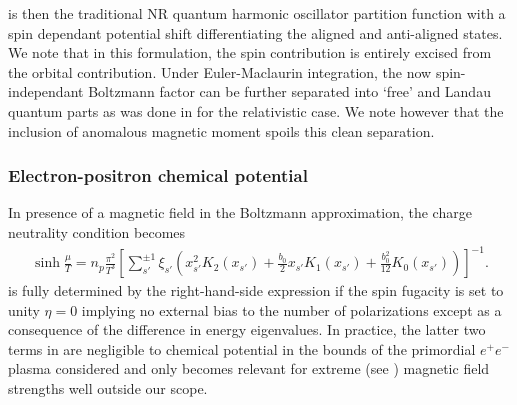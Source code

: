 is then the traditional NR quantum harmonic oscillator partition function with a spin dependant potential shift differentiating the aligned and anti-aligned states. We note that in this formulation, the spin contribution is entirely excised from the orbital contribution. Under Euler-Maclaurin integration, the now spin-independant Boltzmann factor can be further separated into `free' and Landau quantum parts as was done in  for the relativistic case. We note however that the inclusion of anomalous magnetic moment spoils this clean separation.

\subsubsection{Electron-positron chemical potential}
\label{sec:chem}
\noindent In presence of a magnetic field in the Boltzmann approximation, the charge neutrality condition  becomes
\begin{gather}
 \label{chem}
 \sinh\frac{\mu}{T}=n_{p}\frac{\pi^{2}}{T^{3}}
 \left[\sum_{s'}^{\pm1}\xi_{s'}\!\left(\!x_{s'}^{2}K_{2}(x_{s'})\!+\!\frac{b_{0}}{2}x_{s'}K_{1}(x_{s'})\!+\!\frac{b_{0}^{2}}{12}K_{0}(x_{s'}\!)\!\right)\!\right]^{-1}\!.
\end{gather}
 is fully determined by the right-hand-side expression if the spin fugacity is set to unity $\eta=0$ implying no external bias to the number of polarizations except as a consequence of the difference in energy eigenvalues. In practice, the latter two terms in  are negligible to chemical potential in the bounds of the primordial $e^{+}e^{-}$ plasma considered and only becomes relevant for extreme (see ) magnetic field strengths well outside our scope.

